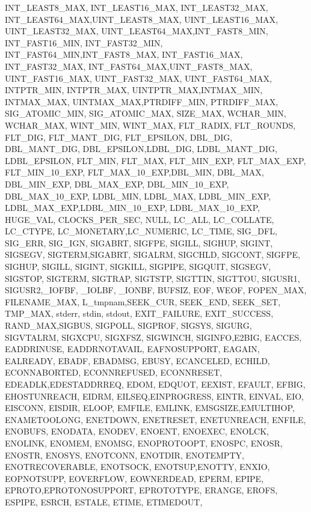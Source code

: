 {{        INT_LEAST8_MAX, INT_LEAST16_MAX, INT_LEAST32_MAX, INT_LEAST64_MAX,UINT_LEAST8_MAX,%
        UINT_LEAST16_MAX, UINT_LEAST32_MAX, UINT_LEAST64_MAX,INT_FAST8_MIN, INT_FAST16_MIN,%
        INT_FAST32_MIN, INT_FAST64_MIN,INT_FAST8_MAX, INT_FAST16_MAX, INT_FAST32_MAX,%
        INT_FAST64_MAX,UINT_FAST8_MAX, UINT_FAST16_MAX, UINT_FAST32_MAX, UINT_FAST64_MAX,%
        INTPTR_MIN, INTPTR_MAX, UINTPTR_MAX,INTMAX_MIN, INTMAX_MAX,%
        UINTMAX_MAX,PTRDIFF_MIN, PTRDIFF_MAX, SIG_ATOMIC_MIN, SIG_ATOMIC_MAX,%
        SIZE_MAX, WCHAR_MIN, WCHAR_MAX, WINT_MIN, WINT_MAX,%
        FLT_RADIX, FLT_ROUNDS, FLT_DIG, FLT_MANT_DIG, FLT_EPSILON,%
        DBL_DIG, DBL_MANT_DIG, DBL_EPSILON,LDBL_DIG, LDBL_MANT_DIG,%
        LDBL_EPSILON, FLT_MIN, FLT_MAX, FLT_MIN_EXP, FLT_MAX_EXP,%
        FLT_MIN_10_EXP, FLT_MAX_10_EXP,DBL_MIN, DBL_MAX, DBL_MIN_EXP,%
        DBL_MAX_EXP, DBL_MIN_10_EXP, DBL_MAX_10_EXP, LDBL_MIN, LDBL_MAX,%
        LDBL_MIN_EXP, LDBL_MAX_EXP,LDBL_MIN_10_EXP, LDBL_MAX_10_EXP, HUGE_VAL,%
        CLOCKS_PER_SEC, NULL, LC_ALL, LC_COLLATE, LC_CTYPE,%
        LC_MONETARY,LC_NUMERIC, LC_TIME, SIG_DFL, SIG_ERR,%
        SIG_IGN, SIGABRT, SIGFPE, SIGILL, SIGHUP,%
        SIGINT, SIGSEGV, SIGTERM,SIGABRT, SIGALRM,%
        SIGCHLD, SIGCONT, SIGFPE, SIGHUP, SIGILL,%
        SIGINT, SIGKILL, SIGPIPE, SIGQUIT, SIGSEGV,%
        SIGSTOP, SIGTERM, SIGTRAP, SIGTSTP, SIGTTIN,%
        SIGTTOU, SIGUSR1, SIGUSR2,_IOFBF, _IOLBF,%
        _IONBF, BUFSIZ, EOF, WEOF, FOPEN_MAX,%
        FILENAME_MAX, L_tmpnam,SEEK_CUR, SEEK_END, SEEK_SET,%
        TMP_MAX, stderr, stdin, stdout, EXIT_FAILURE,%
        EXIT_SUCCESS, RAND_MAX,SIGBUS, SIGPOLL, SIGPROF,%
        SIGSYS, SIGURG, SIGVTALRM, SIGXCPU, SIGXFSZ,%
        SIGWINCH, SIGINFO,E2BIG, EACCES, EADDRINUSE,%
        EADDRNOTAVAIL, EAFNOSUPPORT, EAGAIN, EALREADY, EBADF,%
        EBADMSG, EBUSY, ECANCELED, ECHILD, ECONNABORTED,%
        ECONNREFUSED, ECONNRESET, EDEADLK,EDESTADDRREQ, EDOM,%
        EDQUOT, EEXIST, EFAULT, EFBIG, EHOSTUNREACH,%
        EIDRM, EILSEQ,EINPROGRESS, EINTR, EINVAL,%
        EIO, EISCONN, EISDIR, ELOOP, EMFILE,%
        EMLINK, EMSGSIZE,EMULTIHOP, ENAMETOOLONG, ENETDOWN,%
        ENETRESET, ENETUNREACH, ENFILE, ENOBUFS, ENODATA,%
        ENODEV, ENOENT, ENOEXEC, ENOLCK, ENOLINK,%
        ENOMEM, ENOMSG, ENOPROTOOPT, ENOSPC, ENOSR,%
        ENOSTR, ENOSYS, ENOTCONN, ENOTDIR, ENOTEMPTY,%
        ENOTRECOVERABLE, ENOTSOCK, ENOTSUP,ENOTTY, ENXIO,%
        EOPNOTSUPP, EOVERFLOW, EOWNERDEAD, EPERM, EPIPE,%
        EPROTO,EPROTONOSUPPORT, EPROTOTYPE, ERANGE, EROFS,%
        ESPIPE, ESRCH, ESTALE, ETIME, ETIMEDOUT,%
}}
